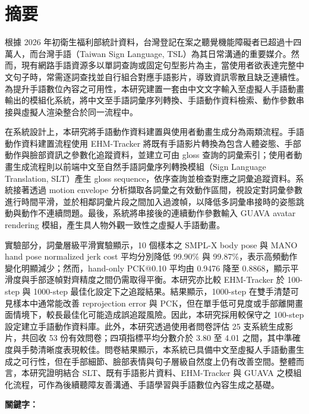 \documentclass[class=NCU_thesis, crop=false]{standalone}
\begin{document}
\chapter{摘要}

根據 2026 年初衛生福利部統計資料，台灣登記在案之聽覺機能障礙者已超過十四萬人，而台灣手語（Taiwan Sign Language, TSL）為其日常溝通的重要媒介。然而，現有網路手語資源多以單詞查詢或固定句型影片為主，當使用者欲表達完整中文句子時，常需逐詞查找並自行組合對應手語影片，導致資訊零散且缺乏連續性。為提升手語數位內容之可用性，本研究建置一套由中文文字輸入至虛擬人手語動畫輸出的模組化系統，將中文至手語詞彙序列轉換、手語動作資料檢索、動作參數串接與虛擬人渲染整合於同一流程中。

在系統設計上，本研究將手語動作資料建置與使用者動畫生成分為兩類流程。手語動作資料建置流程使用 EHM-Tracker 將既有手語影片轉換為包含人體姿態、手部動作與臉部資訊之參數化追蹤資料，並建立可由 gloss 查詢的詞彙索引；使用者動畫生成流程則以前端中文至自然手語詞彙序列轉換模組（Sign Language Translation, SLT）產生 gloss sequence，依序查詢並檢查對應之詞彙追蹤資料。系統接著透過 motion envelope 分析擷取各詞彙之有效動作區間，視設定對詞彙參數進行時間平滑，並於相鄰詞彙片段之間加入過渡幀，以降低多詞彙串接時的姿態跳動與動作不連續問題。最後，系統將串接後的連續動作參數輸入 GUAVA avatar rendering 模組，產生具人物外觀一致性之虛擬人手語動畫。

實驗部分，詞彙層級平滑實驗顯示，10 個樣本之 SMPL-X body pose 與 MANO hand pose normalized jerk cost 平均分別降低 99.90\% 與 99.87\%，表示高頻動作變化明顯減少；然而，hand-only PCK@0.10 平均由 0.9476 降至 0.8868，顯示平滑度與手部逐幀對齊精度之間仍需取得平衡。本研究亦比較 EHM-Tracker 於 100-step 與 1000-step 最佳化設定下之追蹤結果。結果顯示，1000-step 在雙手清楚可見樣本中通常能改善 reprojection error 與 PCK，但在單手低可見度或手部離開畫面情境下，較長最佳化可能造成誤追蹤風險。因此，本研究採用較保守之 100-step 設定建立手語動作資料庫。此外，本研究透過使用者問卷評估 25 支系統生成影片，共回收 53 份有效問卷；四項指標平均分數介於 3.80 至 4.01 之間，其中準確度與手勢清晰度表現較佳。問卷結果顯示，本系統已具備中文至虛擬人手語動畫生成之可行性，但在手部細節、臉部表情與句子層級自然度上仍有改善空間。整體而言，本研究證明結合 SLT、既有手語影片資料、EHM-Tracker 與 GUAVA 之模組化流程，可作為後續聽障友善溝通、手語學習與手語數位內容生成之基礎。

\vspace{2em}
\noindent \textbf{關鍵字：} \keywordsZh{} %
\end{document}
